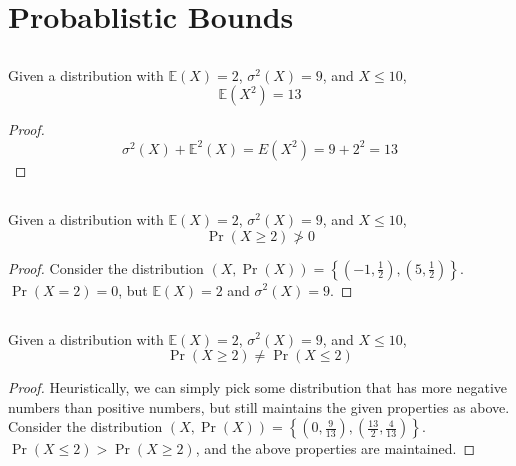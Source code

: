 \documentclass{article}
\newcommand{\E}{\mathbb{E}}
\begin{document}
\section{Probablistic Bounds}

\subsection{}

\begin{theorem}
    Given a distribution with \(\E(X) = 2\), \(\sigma^2(X) = 9\), and \(X \leqslant 10\),
    \begin{equation}
        \E(X^2) = 13
    \end{equation}
\end{theorem}
\begin{proof}
    \begin{equation}
        \sigma^2(X) + \E^2(X) = E(X^2) = 9 + 2^2 = 13
    \end{equation}
\end{proof}

\subsection{}

\begin{theorem}
    Given a distribution with \(\E(X) = 2\), \(\sigma^2(X) = 9\), and \(X \leqslant 10\),
    \begin{equation}
        \Pr(X \geqslant 2) \ngtr 0
    \end{equation}
\end{theorem}
\begin{proof}
    Consider the distribution \((X, \Pr(X)) = \left\{\left(-1, \frac{1}{2}\right), \left(5, \frac{1}{2}\right)\right\}\).
    \(\Pr(X = 2) = 0\), but \(\E(X) = 2\) and \(\sigma^2(X) = 9\).
\end{proof}

\subsection{}

\begin{theorem}
    Given a distribution with \(\E(X) = 2\), \(\sigma^2(X) = 9\), and \(X \leqslant 10\),
    \begin{equation}
        \Pr(X \geqslant 2) \neq \Pr(X \leqslant 2)
    \end{equation}
\end{theorem}
\begin{proof}
    Heuristically, we can simply pick some distribution that has more negative numbers than positive numbers, but still maintains the given properties as above.
    Consider the distribution \((X, \Pr(X)) = \left\{\left(0, \frac{9}{13}\right), \left(\frac{13}{2}, \frac{4}{13}\right)\right\}\).
    \(\Pr(X \leqslant 2) > \Pr(X \geqslant 2)\), and the above properties are maintained.
\end{proof}
\end{document}
